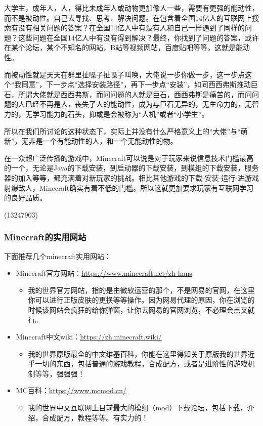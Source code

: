 \documentclass[
]{article}
\providecommand{\tightlist}{%
  \setlength{\itemsep}{0pt}\setlength{\parskip}{0pt}}
\begin{document}
大学生，成年人，人，得比未成年人或动物更加像人一些，需要有更强的能动性，而不是被动性。自己去寻找、思考、解决问题。在包含着全国14亿人的互联网上搜索有没有相关问题的答案？在全国14亿人中有没有人和自己一样遇到了同样的问题？这些问题在全国14亿人中有没有得到解决？最终，你找到了问题的答案，或许在某个论坛，某个不知名的网站，B站等视频网站，百度贴吧等等。这就是能动性。

而被动性就是天天在群里扯嗓子扯嗓子叫唤，大佬说一步你做一步，这一步点这个``我同意''，下一步点``选择安装路径''，再下一步点``安装''，如同西西弗斯推动巨石，所谓大佬就是西西弗斯，而问问题的人就是巨石，西西弗斯是痛苦的，而问问题的人已经不再是人，丧失了人的能动性，成为与巨石无异的，无生命力的，无智力的，无学习能力的石头，抑或是会被称为``人机''或者``小学生''。

所以在我们所讨论的这种状态下，实际上并没有什么严格意义上的``大佬''与``萌新''，无非是一个有能动性的人，和一个无能动性的物。

在一众超广泛传播的游戏中，Minecraft可以说是对于玩家来说信息技术门槛最高的一个，无论是Java的下载安装，到启动器的下载安装，到模组的下载安装，服务器的加入等等，都充满着对新玩家的挑战。相比其他游戏的下载-安装-运行-进游戏射爆敌人，Minecraft确实有着不低的门槛。所以这就更加要求玩家有互联网学习的良好品质。

\begin{flushright}(13247903)\end{flushright}

\subsubsection{Minecraft的实用网站}\label{minecraft-1}

下面推荐几个minecraft实用网站：

\begin{itemize}
\item
  Minecraft官方网站：\url{https://www.minecraft.net/zh-hans}

  \begin{itemize}
  \tightlist
  \item
    我的世界官方网站，指的是由微软运营的那个，不是网易的官网，在这里你可以进行正版皮肤的更换等等操作。因为网易代理的原因，你在浏览的时候该网站会疯狂的给你弹窗，让你去网易的官网浏览，不必理会点叉就行。
  \end{itemize}
\item
  Minecraft中文wiki：\url{https://zh.minecraft.wiki/}

  \begin{itemize}
  \tightlist
  \item
    我的世界原版最全的中文维基百科，你能在这里得知关于原版我的世界近乎一切的东西，包括普通的游戏教程，合成配方，或者是进阶性的游戏机制等等，强强强！
  \end{itemize}
\item
  MC百科：\url{https://www.mcmod.cn/}

  \begin{itemize}
  \tightlist
  \item
    我的世界中文互联网上目前最大的模组（mod）下载论坛，包括下载，介绍，合成配方，教程等等。有实力的！
  \end{itemize}
\end{itemize}
\end{document}
